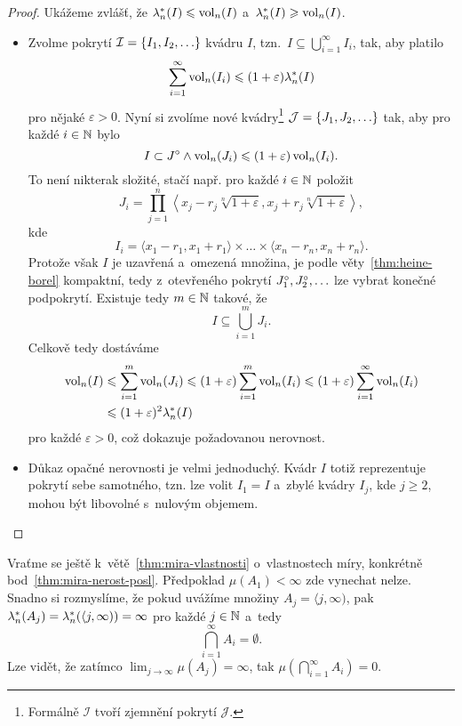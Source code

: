 \begin{proof}
    Ukážeme zvlášť, že $\lambda_n^*(I)\leqslant\operatorname{vol}_n(I)$ a~$\lambda_n^*(I)\geqslant\operatorname{vol}_n(I)$.
    \begin{itemize}
        \item Zvolme pokrytí $\mathcal{I}=\left\{I_1,I_2,\ldots\right\}$ kvádru $I$, tzn.~$I\subseteq\bigcup_{i=1}^\infty I_i$, tak, aby platilo
        \[\sum_{i=1}^{\infty}\operatorname{vol}_n(I_i)\leqslant(1+\varepsilon)\lambda_n^*(I)\]
        pro nějaké $\varepsilon>0$. Nyní si zvolíme nové kvádry\footnote{Formálně $\mathcal{I}$ tvoří zjemnění pokrytí $\mathcal{J}$.} $\mathcal{J}=\left\{J_1,J_2,\ldots\right\}$ tak, aby pro každé $i\in\mathbb{N}$ bylo
        \[I\subset J^\circ\land\operatorname{vol}_n(J_i)\leqslant(1+\varepsilon)\operatorname{vol}_n(I_i).\]
        To není nikterak složité, stačí např. pro každé $i\in\mathbb{N}$ položit
        \[J_i=\prod_{j=1}^{n}\left\langle x_j-r_j\sqrt[n]{1+\varepsilon},x_j+r_j\sqrt[n]{1+\varepsilon}\right\rangle,\]
        kde
        \[I_i=\langle x_1-r_1,x_1+r_1\rangle\times\ldots\times\langle x_n-r_n,x_n+r_n\rangle.\]
        Protože však $I$ je uzavřená a~omezená množina, je podle věty~\ref{thm:heine-borel} kompaktní, tedy z~otevřeného pokrytí $J_1^\circ,J_2^\circ,\ldots$ lze vybrat konečné podpokrytí. Existuje tedy $m\in\mathbb{N}$ takové, že
        \[I\subseteq\bigcup_{i=1}^m J_i.\]
        Celkově tedy dostáváme
        \begin{align*}
            \operatorname{vol}_n(I)&\leqslant\sum_{i=1}^{m}\operatorname{vol}_n(J_i)\leqslant(1+\varepsilon)\sum_{i=1}^{m}\operatorname{vol}_n(I_i)\leqslant(1+\varepsilon)\sum_{i=1}^{\infty}\operatorname{vol}_n(I_i)\\
            &\leqslant (1+\varepsilon)^2\lambda_n^*(I)
        \end{align*}
        pro každé $\varepsilon>0$, což dokazuje požadovanou nerovnost.
        \item Důkaz opačné nerovnosti je velmi jednoduchý. Kvádr $I$ totiž reprezentuje pokrytí sebe samotného, tzn. lze volit $I_1=I$ a~zbylé kvádry $I_j$, kde $j\geqslant 2$, mohou být libovolné s~nulovým objemem.
    \end{itemize}
\end{proof}
\begin{remark}
    Vraťme se ještě k~větě~\ref{thm:mira-vlastnosti} o~vlastnostech míry, konkrétně bod~\ref{thm:mira-nerost-posl}. Předpoklad $\mu(A_1)<\infty$ zde vynechat nelze. Snadno si rozmyslíme, že pokud uvážíme množiny $A_j=\langle j,\infty)$, pak $\lambda_n^*(A_j)=\lambda_n^*(\langle j,\infty))=\infty$ pro každé $j\in\mathbb{N}$ a~tedy
    \[\bigcap_{i=1}^\infty A_i=\emptyset.\]
    Lze vidět, že zatímco $\lim_{j\to\infty}\mu(A_j)=\infty$, tak $\mu\left(\bigcap_{i=1}^\infty A_i\right)=0$.
\end{remark}

